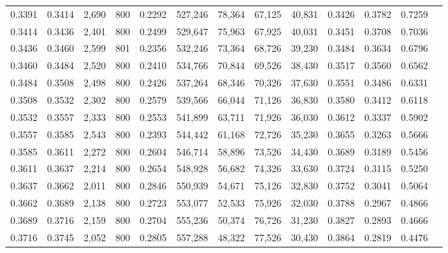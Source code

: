 \begin{tabular}{rrrrrrrrrrrrr}
0.3391 & 0.3414 &  2,690 &   800 &                                     0.2292 & 527,246 &  78,364 &  67,125 &  40,831 & 0.3426 & 0.3782 & 0.7259 \\
0.3414 & 0.3436 &  2,401 &   800 &                                     0.2499 & 529,647 &  75,963 &  67,925 &  40,031 & 0.3451 & 0.3708 & 0.7036 \\
0.3436 & 0.3460 &  2,599 &   801 &                                     0.2356 & 532,246 &  73,364 &  68,726 &  39,230 & 0.3484 & 0.3634 & 0.6796 \\
0.3460 & 0.3484 &  2,520 &   800 &                                     0.2410 & 534,766 &  70,844 &  69,526 &  38,430 & 0.3517 & 0.3560 & 0.6562 \\
0.3484 & 0.3508 &  2,498 &   800 &                                     0.2426 & 537,264 &  68,346 &  70,326 &  37,630 & 0.3551 & 0.3486 & 0.6331 \\
0.3508 & 0.3532 &  2,302 &   800 &                                     0.2579 & 539,566 &  66,044 &  71,126 &  36,830 & 0.3580 & 0.3412 & 0.6118 \\
0.3532 & 0.3557 &  2,333 &   800 &                                     0.2553 & 541,899 &  63,711 &  71,926 &  36,030 & 0.3612 & 0.3337 & 0.5902 \\
0.3557 & 0.3585 &  2,543 &   800 &                                     0.2393 & 544,442 &  61,168 &  72,726 &  35,230 & 0.3655 & 0.3263 & 0.5666 \\
0.3585 & 0.3611 &  2,272 &   800 &                                     0.2604 & 546,714 &  58,896 &  73,526 &  34,430 & 0.3689 & 0.3189 & 0.5456 \\
0.3611 & 0.3637 &  2,214 &   800 &                                     0.2654 & 548,928 &  56,682 &  74,326 &  33,630 & 0.3724 & 0.3115 & 0.5250 \\
0.3637 & 0.3662 &  2,011 &   800 &                                     0.2846 & 550,939 &  54,671 &  75,126 &  32,830 & 0.3752 & 0.3041 & 0.5064 \\
0.3662 & 0.3689 &  2,138 &   800 &                                     0.2723 & 553,077 &  52,533 &  75,926 &  32,030 & 0.3788 & 0.2967 & 0.4866 \\
0.3689 & 0.3716 &  2,159 &   800 &                                     0.2704 & 555,236 &  50,374 &  76,726 &  31,230 & 0.3827 & 0.2893 & 0.4666 \\
0.3716 & 0.3745 &  2,052 &   800 &                                     0.2805 & 557,288 &  48,322 &  77,526 &  30,430 & 0.3864 & 0.2819 & 0.4476 \\

\end{tabular}
